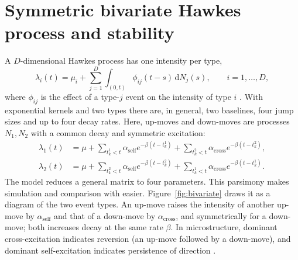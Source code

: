 \section{Symmetric bivariate Hawkes process and stability}

A \(D\)-dimensional Hawkes process has one intensity per type,
\[
 \lambda_i(t)=\mu_i+\sum_{j=1}^{D}\int_{(0,t)}\phi_{ij}(t-s)\,\mathrm dN_j(s),
 \qquad i=1,\dots,D,
\]
where \(\phi_{ij}\) is the effect of a type-\(j\) event on the intensity of type \(i\)
\citep{hawkes1971b,bacry2015}. With exponential kernels and two types there are, in general,
two baselines, four jump sizes and up to four decay rates. Here,
up-moves and down-moves are processes \(N_1,N_2\) with a common decay and symmetric
excitation:
\begin{align}
\lambda_1(t)&=\mu+\sum_{t_k^1<t}\alpha_{\mathrm{self}}e^{-\beta(t-t_k^1)}
 +\sum_{t_k^2<t}\alpha_{\mathrm{cross}}e^{-\beta(t-t_k^2)},\\
\lambda_2(t)&=\mu+\sum_{t_k^2<t}\alpha_{\mathrm{self}}e^{-\beta(t-t_k^2)}
 +\sum_{t_k^1<t}\alpha_{\mathrm{cross}}e^{-\beta(t-t_k^1)}.
\end{align}
The model reduces a general matrix to four parameters. This parsimony makes
simulation and comparison with \citet{lee2023} easier. Figure~\ref{fig:bivariate} draws it
as a diagram of the two event types. An up-move raises the intensity of another up-move by
\(\alpha_{\mathrm{self}}\) and that of a down-move by \(\alpha_{\mathrm{cross}}\), and
symmetrically for a down-move; both increases decay at the same rate \(\beta\). In
microstructure, dominant cross-excitation indicates reversion (an up-move followed by a
down-move), and dominant self-excitation indicates persistence of direction
\citep{bacry2013}.

